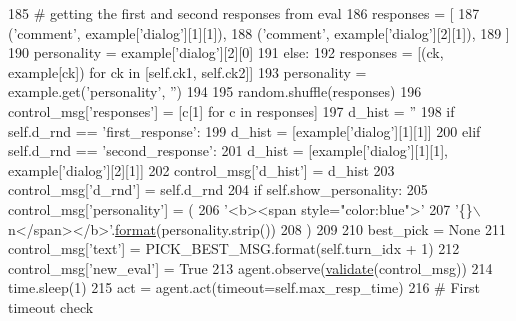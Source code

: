 \begin{DoxyCode}
185                 \textcolor{comment}{# getting the first and second responses from eval}
186                 responses = [
187                     (\textcolor{stringliteral}{'comment'}, example[\textcolor{stringliteral}{'dialog'}][1][1]),
188                     (\textcolor{stringliteral}{'comment'}, example[\textcolor{stringliteral}{'dialog'}][2][1]),
189                 ]
190                 personality = example[\textcolor{stringliteral}{'dialog'}][2][0]
191             \textcolor{keywordflow}{else}:
192                 responses = [(ck, example[ck]) \textcolor{keywordflow}{for} ck \textcolor{keywordflow}{in} [self.ck1, self.ck2]]
193                 personality = example.get(\textcolor{stringliteral}{'personality'}, \textcolor{stringliteral}{''})
194 
195             random.shuffle(responses)
196             control\_msg[\textcolor{stringliteral}{'responses'}] = [c[1] \textcolor{keywordflow}{for} c \textcolor{keywordflow}{in} responses]
197             d\_hist = \textcolor{stringliteral}{''}
198             \textcolor{keywordflow}{if} self.d\_rnd == \textcolor{stringliteral}{'first\_response'}:
199                 d\_hist = [example[\textcolor{stringliteral}{'dialog'}][1][1]]
200             \textcolor{keywordflow}{elif} self.d\_rnd == \textcolor{stringliteral}{'second\_response'}:
201                 d\_hist = [example[\textcolor{stringliteral}{'dialog'}][1][1], example[\textcolor{stringliteral}{'dialog'}][2][1]]
202             control\_msg[\textcolor{stringliteral}{'d\_hist'}] = d\_hist
203             control\_msg[\textcolor{stringliteral}{'d\_rnd'}] = self.d\_rnd
204             \textcolor{keywordflow}{if} self.show\_personality:
205                 control\_msg[\textcolor{stringliteral}{'personality'}] = (
206                     \textcolor{stringliteral}{'<b><span style="color:blue">'}
207                     \textcolor{stringliteral}{'\{\}\(\backslash\)n</span></b>'}.\hyperlink{namespaceparlai_1_1chat__service_1_1services_1_1messenger_1_1shared__utils_a32e2e2022b824fbaf80c747160b52a76}{format}(personality.strip())
208                 )
209 
210             best\_pick = \textcolor{keywordtype}{None}
211             control\_msg[\textcolor{stringliteral}{'text'}] = PICK\_BEST\_MSG.format(self.turn\_idx + 1)
212             control\_msg[\textcolor{stringliteral}{'new\_eval'}] = \textcolor{keyword}{True}
213             agent.observe(\hyperlink{namespaceparlai_1_1core_1_1worlds_afc3fad603b7bce41dbdc9cdc04a9c794}{validate}(control\_msg))
214             time.sleep(1)
215             act = agent.act(timeout=self.max\_resp\_time)
216             \textcolor{comment}{# First timeout check}

\end{DoxyCode}
